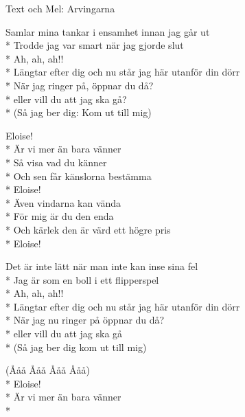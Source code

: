 \begin{SongText}[Eloise]
    \begin{SongInfo}
        Text och Mel: Arvingarna
    \end{SongInfo}
    \begin{SongVerse}
        Samlar mina tankar i ensamhet innan jag går ut\\*%
        Trodde jag var smart när jag gjorde slut\\*%
        Ah, ah, ah!!\\*%
        Längtar efter dig och nu står jag här utanför din dörr\\*%
        När jag ringer på, öppnar du då?\\*%
        eller vill du att jag ska gå?\\*%
        (Så jag ber dig: Kom ut till mig)
    \end{SongVerse}
    \begin{SongVerse}
        Eloise!\\*%
        Är vi mer än bara vänner\\*%
        Så visa vad du känner\\*%
        Och sen får känslorna bestämma\\*%
        Eloise!\\*%
        Även vindarna kan vända\\*%
        För mig är du den enda\\*%
        Och kärlek den är värd ett högre pris\\*%
        Eloise!
    \end{SongVerse}
    \begin{SongVerse}
        Det är inte lätt när man inte kan inse sina fel\\*%
        Jag är som en boll i ett flipperspel\\*%
        Ah, ah, ah!!\\*%
        Längtar efter dig och nu står jag här utanför din dörr\\*%
        När jag nu ringer på öppnar du då?\\*%
        eller vill du att jag ska gå\\*%
        (Så jag ber dig kom ut till mig)
    \end{SongVerse}
    \begin{SongVerse}
        (Ååå Ååå Ååå Ååå)\\*%
        Eloise!\\*%
        Är vi mer än bara vänner\\*%

\end{SongVerse}
\end{SongText}
